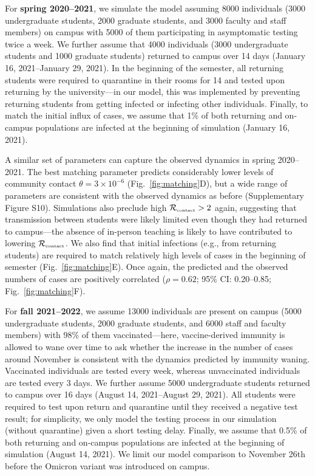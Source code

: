 \documentclass[12pt]{article}
\newcommand{\fref}[1]{Fig.~\ref{fig:#1}}
\newcommand{\Rx}[1]{\ensuremath{{\mathcal R}_{#1}}}
\newcommand{\Rc}{\Rx{\textrm{\tiny{contact}}}}
\begin{document}
For \textbf{spring 2020--2021}, we simulate the model assuming 8000 individuals (3000 undergraduate students, 2000 graduate students, and 3000 faculty and staff members) on campus with 5000 of them participating in asymptomatic testing twice a week.
We further assume that 4000 individuals (3000 undergraduate students and 1000 graduate students) returned to campus over 14 days (January 16, 2021--January 29, 2021).
In the beginning of the semester, all returning students were required to quarantine in their rooms for 14 and tested upon returning by the university---in our model, this was implemented by preventing returning students from getting infected or infecting other individuals.
Finally, to match the initial influx of cases, we assume that 1\% of both returning and on-campus populations are infected at the beginning of simulation (January 16, 2021).

A similar set of parameters can capture the observed dynamics in spring 2020--2021.
The best matching parameter predicts considerably lower levels of community contact $\theta=3\times 10^{-6}$ (\fref{matching}D), but a wide range of parameters are consistent with the observed dynamics as before (Supplementary Figure S10). 
Simulations also preclude high $\Rc > 2$ again, suggesting that transmission between students were likely limited even though they had returned to campus---the absence of in-person teaching is likely to have contributed to lowering $\Rc$.
We also find that initial infections (e.g., from returning students) are required to match relatively high levels of cases in the beginning of semester (\fref{matching}E). 
Once again, the predicted and the observed numbers of cases are positively correlated ($\rho = 0.62$; 95\% CI: 0.20--0.85; \fref{matching}F).

For \textbf{fall 2021--2022}, we assume 13000 individuals are present on campus (5000 undergraduate students, 2000 graduate students, and 6000 staff and faculty members) with 98\% of them vaccinated---here, vaccine-derived immunity is allowed to wane over time to ask whether the increase in the number of cases around November is consistent with the dynamics predicted by immunity waning.
Vaccinated individuals are tested every week, whereas unvaccinated individuals are tested every 3 days. 
We further assume 5000 undergraduate students returned to campus over 16 days (August 14, 2021--August 29, 2021).
All students were required to test upon return and quarantine until they received a negative test result;
for simplicity, we only model the testing process in our simulation (without quarantine) given a short testing delay.
Finally, we assume that 0.5\% of both returning and on-campus populations are infected at the beginning of simulation (August 14, 2021).
We limit our model comparison to November 26th before the Omicron variant was introduced on campus.
\end{document}

